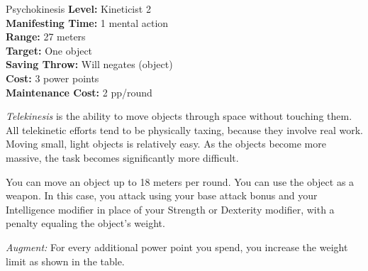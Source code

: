 {Psychokinesis}
{
	\textbf{Level:}
	Kineticist 2\\
	\textbf{Manifesting Time:}
	1 mental action\\
	\textbf{Range:}
	27 meters\\
	\textbf{Target:}
	One object\\
	\textbf{Saving Throw:}
	Will negates (object)\\
	\textbf{Cost:}
	3 power points\\
	\textbf{Maintenance Cost:}
	2 pp/round\\
}
{
	\emph{Telekinesis} is the ability to move objects through space without touching them.  All telekinetic efforts tend to be physically taxing, because they involve real work. Moving small, light objects is relatively easy. As the objects become more massive, the task becomes significantly more difficult.

	You can move an object up to 18 meters per round. You can use the object as a weapon. In this case, you attack using your base attack bonus and your Intelligence modifier in place of your Strength or Dexterity modifier, with a penalty equaling \onethird the object's weight.

	\textit{Augment:} For every additional power point you spend, you increase the weight limit as shown in the table.

}